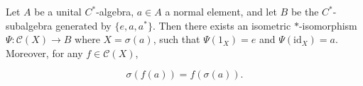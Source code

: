 Let $A$ be a unital $C^*$-algebra, $a \in A$ a normal element, and let $B$ be the $C^*$-subalgebra generated by $\{e, a, a^*\}$. Then there exists an isometric $*$-isomorphism $\Psi : \mathcal{C}(X) \to B$ where $X = \sigma(a)$, such that $\Psi(1_X) = e$ and $\Psi(\mathrm{id}_X) = a$. Moreover, for any $f \in \mathcal{C}(X)$,

$$\sigma(f(a)) = f(\sigma(a)).$$
